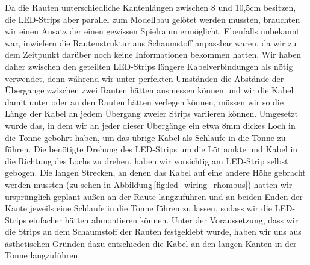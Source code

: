         Da die Rauten unterschiedliche Kantenlängen zwischen 8 und 10,5cm besitzen, die LED-Strips aber parallel zum Modellbau gelötet werden mussten, brauchten wir einen Ansatz der einen gewissen Spielraum ermöglicht. Ebenfalls unbekannt war, inwiefern die Rautenstruktur aus Schaumstoff anpassbar waren, da wir zu dem Zeitpunkt darüber noch keine Informationen bekommen hatten.
        Wir haben daher zwischen den geteilten LED-Strips längere Kabelverbindungen als nötig verwendet, denn während wir unter perfekten Umständen die Abstände der Übergange zwischen zwei Rauten hätten ausmessen können und wir die Kabel damit unter oder an den Rauten hätten verlegen können, müssen wir so die Länge der Kabel an jedem Übergang zweier Strips variieren können.
        Umgesetzt wurde das, in dem wir an jeder dieser Übergänge ein etwa 8mm dickes Loch in die Tonne gebohrt haben, um das übrige Kabel als Schlaufe in die Tonne zu führen. Die benötigte Drehung des LED-Strips um die Lötpunkte und Kabel in die Richtung des Lochs zu drehen, haben wir vorsichtig am LED-Strip selbst gebogen.
        Die langen Strecken, an denen das Kabel auf eine andere Höhe gebracht  werden mussten (zu sehen in Abbildung\,\ref{fig:led_wiring_rhombus}) hatten wir ursprünglich geplant außen an der Raute langzuführen und an beiden Enden der Kante jeweils eine Schlaufe in die Tonne führen zu lassen, sodass wir die LED-Strips einfacher hätten abmontieren können.
        Unter der Voraussetzung, dass wir die Strips an dem Schaumstoff der Rauten festgeklebt wurde, haben wir uns aus ästhetischen Gründen dazu entschieden die Kabel an den langen Kanten in der Tonne langzuführen.

